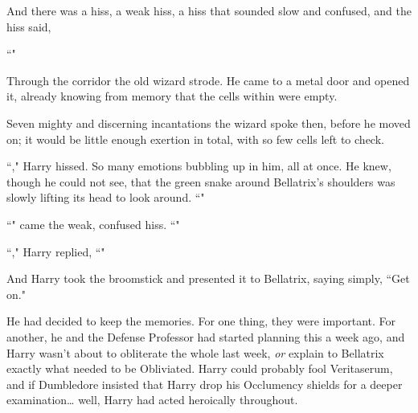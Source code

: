 And there was a hiss, a weak hiss, a hiss that sounded slow and confused, and the hiss said,

``"

\later

Through the corridor the old wizard strode. He came to a metal door and opened it, already knowing from memory that the cells within were empty.

Seven mighty and discerning incantations the wizard spoke then, before he moved on; it would be little enough exertion in total, with so few cells left to check.

\later

``," Harry hissed. So many emotions bubbling up in him, all at once. He knew, though he could not see, that the green snake around Bellatrix's shoulders was slowly lifting its head to look around. ``"

``" came the weak, confused hiss. ``"

``," Harry replied, ``"

And Harry took the broomstick and presented it to Bellatrix, saying simply, ``Get on."

He had decided to keep the memories. For one thing, they were important. For another, he and the Defense Professor had started planning this a week ago, and Harry wasn't about to obliterate the whole last week, \emph{or} explain to Bellatrix exactly what needed to be Obliviated. Harry could probably fool Veritaserum, and if Dumbledore insisted that Harry drop his Occlumency shields for a deeper examination{\ldots} well, Harry had acted heroically throughout.

